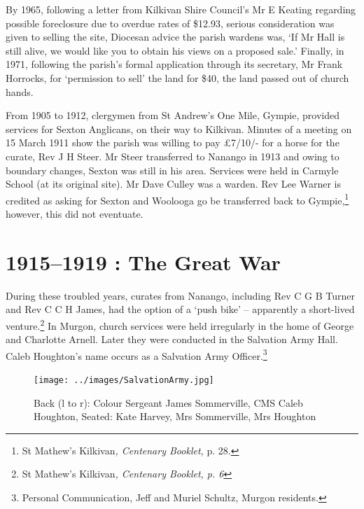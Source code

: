 By 1965, following a letter from Kilkivan Shire Council's Mr E Keating regarding possible foreclosure due to overdue rates of \$12.93, serious consideration was given to selling the site, Diocesan advice the parish wardens was, `If Mr Hall is still alive, we would like you to obtain his views on a proposed sale.' Finally, in 1971, following the parish's formal application through its secretary, Mr Frank Horrocks, for `permission to sell' the land for \$40, the land passed out of church hands.



From 1905 to 1912, clergymen from St Andrew's One Mile, Gympie, provided services for Sexton Anglicans, on their way to Kilkivan. Minutes of a meeting on 15 March 1911 show the parish was willing to pay \pounds7/10/- for a horse for the curate, Rev J H Steer. Mr Steer transferred to Nanango in 1913 and owing to boundary changes, Sexton was still in his area. Services were held in Carmyle School (at its original site). Mr Dave Culley was a warden. Rev Lee Warner is credited as asking for Sexton and Woolooga go be transferred back to Gympie,\footnote{St Mathew's Kilkivan\emph{, Centenary Booklet,} p. 28.} however, this did not eventuate.


\section{1915--1919 : The Great War}



During these troubled years, curates from Nanango, including Rev C G B Turner and Rev C C H James\emph{,} had the option of a `push bike' -- apparently a short-lived venture.\footnote{St Mathew's Kilkivan\emph{, Centenary Booklet, p. 6}} In Murgon, church services were held irregularly in the home of George and Charlotte Arnell. Later they were conducted in the Salvation Army Hall. Caleb Houghton's name occurs as a Salvation Army Officer.\footnote{Personal Communication, Jeff and Muriel Schultz, Murgon residents.}








\begin{figure}
\begin{center}
\texttt{[image: ../images/SalvationArmy.jpg]}
\caption{Back (l to r): Colour Sergeant James Sommerville, CMS Caleb Houghton, Seated: Kate Harvey, Mrs Sommerville, Mrs Houghton}
\end{center}
\end{figure}




